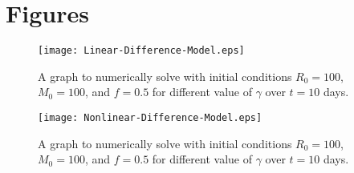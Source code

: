 \section{Figures}\label{sec:figures}

\begin{figure}[H] 
    \centering
    \texttt{[image: Linear-Difference-Model.eps]}
    \caption{A graph to numerically solve  with initial conditions $R_0=100$, $M_0=100$, and $f=0.5$ for different value of $\gamma$ over $t=10$ days.}
    \label{fig:1}
\end{figure}

\begin{figure}[H] 
    \centering
    \texttt{[image: Nonlinear-Difference-Model.eps]}
    \caption{A graph to numerically solve  with initial conditions $R_0=100$, $M_0=100$, and $f=0.5$ for different value of $\gamma$ over $t=10$ days.}
    \label{fig:2}
\end{figure}